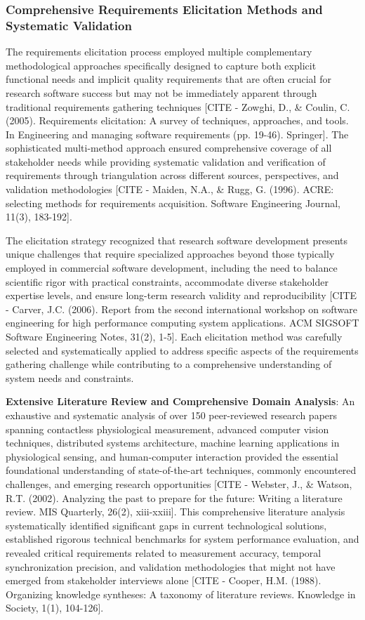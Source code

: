 \documentclass[12pt,a4paper]{report}
\begin{document}
\subsubsection{Comprehensive Requirements Elicitation Methods and Systematic Validation}

The requirements elicitation process employed multiple complementary methodological approaches specifically designed to
capture both explicit functional needs and implicit quality requirements that are often crucial for research software
success but may not be immediately apparent through traditional requirements gathering
techniques [CITE - Zowghi, D., \& Coulin, C. (2005). Requirements elicitation: A survey of techniques, approaches, and tools. In Engineering and managing software requirements (pp. 19-46). Springer].
The sophisticated multi-method approach ensured comprehensive coverage of all stakeholder needs while providing
systematic validation and verification of requirements through triangulation across different sources, perspectives, and
validation
methodologies [CITE - Maiden, N.A., \& Rugg, G. (1996). ACRE: selecting methods for requirements acquisition. Software Engineering Journal, 11(3), 183-192].

The elicitation strategy recognized that research software development presents unique challenges that require
specialized approaches beyond those typically employed in commercial software development, including the need to balance
scientific rigor with practical constraints, accommodate diverse stakeholder expertise levels, and ensure long-term
research validity and
reproducibility [CITE - Carver, J.C. (2006). Report from the second international workshop on software engineering for high performance computing system applications. ACM SIGSOFT Software Engineering Notes, 31(2), 1-5].
Each elicitation method was carefully selected and systematically applied to address specific aspects of the
requirements gathering challenge while contributing to a comprehensive understanding of system needs and constraints.

\textbf{Extensive Literature Review and Comprehensive Domain Analysis}: An exhaustive and systematic analysis of over 150
peer-reviewed research papers spanning contactless physiological measurement, advanced computer vision techniques,
distributed systems architecture, machine learning applications in physiological sensing, and human-computer interaction
provided the essential foundational understanding of state-of-the-art techniques, commonly encountered challenges, and
emerging research
opportunities [CITE - Webster, J., \& Watson, R.T. (2002). Analyzing the past to prepare for the future: Writing a literature review. MIS Quarterly, 26(2), xiii-xxiii].
This comprehensive literature analysis systematically identified significant gaps in current technological solutions,
established rigorous technical benchmarks for system performance evaluation, and revealed critical requirements related
to measurement accuracy, temporal synchronization precision, and validation methodologies that might not have emerged
from stakeholder interviews
alone [CITE - Cooper, H.M. (1988). Organizing knowledge syntheses: A taxonomy of literature reviews. Knowledge in Society, 1(1), 104-126].
\end{document}
